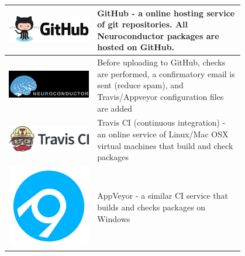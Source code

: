 \documentclass[final]{beamer}\usepackage[]{graphicx}\usepackage[]{color}
\begin{document}
\begin{frame}[fragile]
\begin{table}[!htb]
\begin{minipage}{0.36\linewidth}
\begin{tabular}{m{0.3\linewidth}m{0.5\linewidth}}
\includegraphics[clip, scale=0.14, keepaspectratio]{figures/github-logo.png} 
& GitHub - a online hosting service of git repositories.  All Neuroconductor packages are hosted on GitHub.  \\ \hline
\includegraphics[clip, scale=0.8, keepaspectratio]{figures/neuroconductor_brain_type_bbg.png} 
& Before uploading to GitHub, checks are performed, a confirmatory email is sent (reduce spam), and Travis/Appveyor configuration files are added \\ \hline
\includegraphics[clip, scale=0.5, keepaspectratio]{figures/travis_logo.png} & Travis CI (continuous integration) - an online service of Linux/Mac OSX virtual machines that build and check packages  \\ \hline
\includegraphics[clip, scale=0.5, keepaspectratio]{figures/appveyor-logo-256.png} & AppVeyor - a similar CI service that builds and checks packages on Windows 
\end{tabular}



\end{minipage}
\end{table}
\end{frame}
\end{document}
